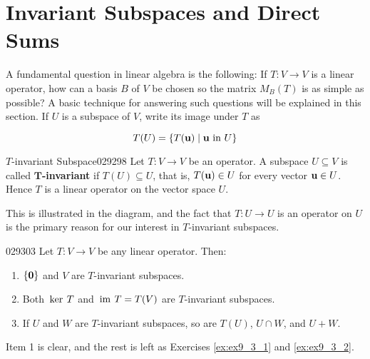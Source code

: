 \section{Invariant Subspaces and Direct Sums}
\label{sec:9_3}

A fundamental question in linear algebra is the following: If $T : V \to V$ is a linear operator, how can a basis $B$ of $V$ be chosen so the matrix $M_{B}(T)$ is as simple as possible? A basic technique for answering such questions will be explained in this section. If $U$ is a subspace of $V$, write its image under $T$ as

\begin{equation*}
T(U) = \{T(\textbf{u}) \mid \textbf{u} \mbox{ in } U\}
\end{equation*}

\newpage
\begin{wrapfigure}[4]{l}{5cm}
    \vspace{2em}
 	\centering
	
\end{wrapfigure}

\vspace*{-2em}

\hfill\begin{definition}{$T$-invariant Subspace}{029298}
Let $T : V \to V$ be an operator. A subspace $U \subseteq V$ is called $\bm{T}$\textbf{-invariant} if $T(U) \subseteq U$, that is, $T(\textbf{u}) \in U$ for every vector $\textbf{u} \in U$. Hence $T$ is a linear operator on the vector space $U$.
\end{definition}

This is illustrated in the diagram, and the fact that $T : U \to U$ is an operator on $U$ is the primary reason for our interest in $T$-invariant subspaces.



\begin{example}{}{029303}
Let $T : V \to V$ be any linear operator. Then:


\begin{enumerate}
\item $\{\textbf{0}\}$ and $V$ are $T$-invariant subspaces.

\item Both $\thinspace\operatorname{ker \medspace}T$ and $\thinspace\operatorname{im \medspace}T = T(V)$ are $T$-invariant subspaces.

\item If $U$ and $W$ are $T$-invariant subspaces, so are $T(U)$, $U \cap W$, and $U + W$.

\end{enumerate}

\begin{solution}
  Item 1 is clear, and the rest is left as Exercises \ref{ex:ex9_3_1} and \ref{ex:ex9_3_2}.
\end{solution}
\end{example}

